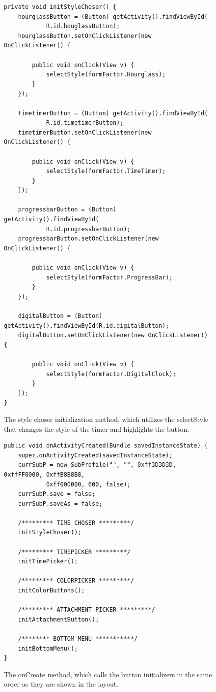 \begin{figure}[H]
\begin{lstlisting}
private void initStyleChoser() {
	hourglassButton = (Button) getActivity().findViewById(
			R.id.houglassButton);
	hourglassButton.setOnClickListener(new OnClickListener() {

		public void onClick(View v) {
			selectStyle(formFactor.Hourglass);
		}
	});

	timetimerButton = (Button) getActivity().findViewById(
			R.id.timetimerButton);
	timetimerButton.setOnClickListener(new OnClickListener() {

		public void onClick(View v) {
			selectStyle(formFactor.TimeTimer);
		}
	});

	progressbarButton = (Button) getActivity().findViewById(
			R.id.progressbarButton);
	progressbarButton.setOnClickListener(new OnClickListener() {

		public void onClick(View v) {
			selectStyle(formFactor.ProgressBar);
		}
	});

	digitalButton = (Button) getActivity().findViewById(R.id.digitalButton);
	digitalButton.setOnClickListener(new OnClickListener() {

		public void onClick(View v) {
			selectStyle(formFactor.DigitalClock);
		}
	});
}
\end{lstlisting}
\caption{The style choser initialization method, which utilizes the selectStyle that changes the style of the timer and highlights the button.}%
\label{code:customize:style_choser}%
\end{figure}

\begin{figure}[H]
\begin{lstlisting}
public void onActivityCreated(Bundle savedInstanceState) {
	super.onActivityCreated(savedInstanceState);
	currSubP = new SubProfile("", "", 0xff3D3D3D, 0xffFF0000, 0xffB8B8B8,
			0xff000000, 600, false);
	currSubP.save = false;
	currSubP.saveAs = false;

	/********* TIME CHOSER *********/
	initStyleChoser();

	/********* TIMEPICKER *********/
	initTimePicker();

	/********* COLORPICKER *********/
	initColorButtons();

	/********* ATTACHMENT PICKER *********/
	initAttachmentButton();

	/******** BOTTOM MENU ***********/
	initBottomMenu();
}
\end{lstlisting}
\caption{The onCreate method, which calls the button initializers in the same order as they are shown in the layout.}%
\label{code:customize:oncreate}%
\end{figure}

